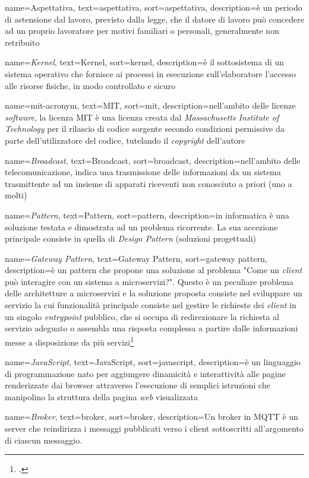 {
  name=Aspettativa,
  text=aspettativa,
  sort=aspettativa,
  description={è un periodo di astensione dal lavoro, previsto dalla legge, che il datore di lavoro può concedere ad un proprio lavoratore per motivi familiari o personali, generalmente non retribuito}
}

{
  name=\emph{Kernel},
  text={Kernel},
  sort=kernel,
  description={è il sottosistema di un sistema operativo che fornisce ai processi in esecuzione sull'elaboratore l'accesso alle risorse fisiche, in modo controllato e sicuro}
}

{
  name=\gls{mit-acronym},
  text=MIT,
  sort=mit,
  description={nell'ambito delle licenze \emph{software}, la licenza MIT è una licenza creata dal \emph{Massachusetts Institute of Technology} per il rilascio di codice sorgente secondo condizioni permissive da parte dell'utilizzatore del codice, tutelando il \emph{copyright} dell'autore}
}

{
  name=\emph{Broadcast},
  text={Broadcast},
  sort=broadcast,
  description={nell'ambito delle telecomunicazione, indica una trasmissione delle informazioni da un sistema trasmittente ad un insieme di apparati riceventi non conosciuto a priori (uno a molti)}
}

{
  name=\emph{Pattern},
  text={Pattern},
  sort=pattern,
  description={in informatica è una soluzione testata e dimostrata ad un problema ricorrente. La sua accezione principale consiste in quella di \emph{Design Pattern} (soluzioni progettuali)}
}

{
  name=\emph{Gateway Pattern},
  text={Gateway Pattern},
  sort=gateway pattern,
  description={è un \gls{pattern} che propone una soluzione al problema "Come un \emph{client} può interagire con un sistema a microservizi?". Questo è un peculiare problema delle architetture a microservizi e la soluzione proposta consiste nel sviluppare un servizio la cui funzionalità principale consiste nel gestire le richieste dei \emph{client} in un singolo \emph{entrypoint} pubblico, che si occupa di redirezionare la richiesta al servizio adeguato o assembla una risposta complessa a partire dalle informazioni messe a disposizione da più servizi\footcite{gateway-pattern}}
}

{
  name=\emph{JavaScript},
  text={JavaScript},
  sort={javascript},
  description={è un linguaggio di programmazione nato per aggiungere dinamicità e interattività alle pagine renderizzate dai browser attraverso l'esecuzione di semplici istruzioni che manipolino la struttura della pagina \emph{web} visualizzata}
}

{
  name=\emph{Broker},
  text={broker},
  sort={broker},
  description={Un broker in MQTT è un server che reindirizza i messaggi pubblicati verso i client sottoscritti all'argomento di ciascun messaggio.}
}
